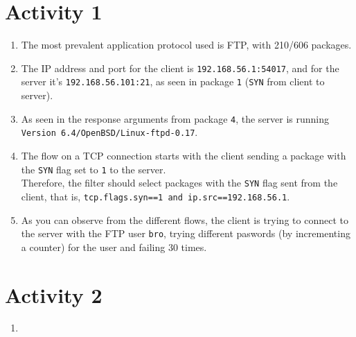 \section*{Activity 1}
\begin{enumerate}
    \item The most prevalent application protocol used is FTP, with 210/606 packages.
    \item The IP address and port for the client is \texttt{192.168.56.1:54017}, and for the server it's \texttt{192.168.56.101:21}, as seen in package \texttt{1} (\texttt{SYN} from client to server).
    \item As seen in the response arguments from package \texttt{4}, the server is running \texttt{Version 6.4/OpenBSD/Linux-ftpd-0.17}.
    \item The flow on a TCP connection starts with the client sending a package with the \texttt{SYN} flag set to \texttt{1} to the server.\\
    Therefore, the filter should select packages with the \texttt{SYN} flag sent from the client, that is, \texttt{tcp.flags.syn==1 and ip.src==192.168.56.1}.
    \item As you can observe from the different flows, the client is trying to connect to the server with the FTP user \texttt{bro}, trying different paswords (by incrementing a counter) for the user and failing 30 times.
\end{enumerate}

\section*{Activity 2}
\begin{enumerate}
    \item
\end{enumerate}